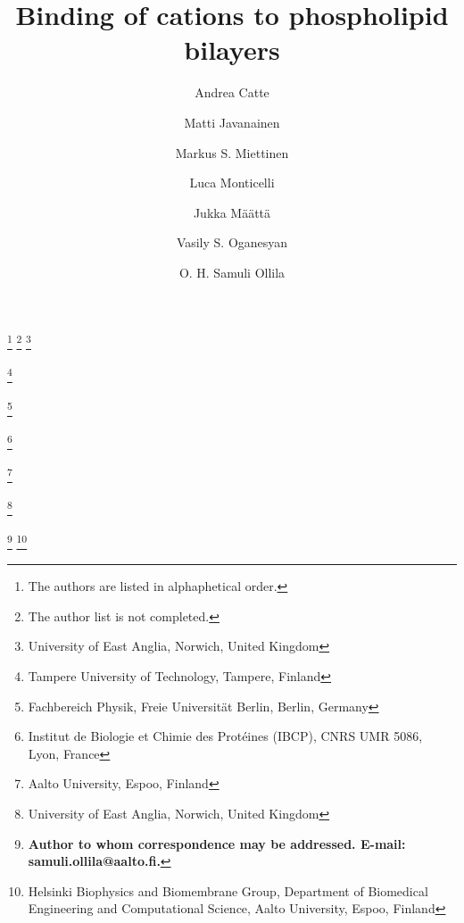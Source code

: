 \documentclass[pre,aps,floatfix,authordate1-4,twocolumn]{revtex4-1}
\begin{document}

\title{Binding of cations to phospholipid bilayers}

\author{Andrea Catte}
\thanks{The authors are listed in alphaphetical order.}
\thanks{The author list is not completed.}
\thanks{University of East Anglia, Norwich, United Kingdom}
\author{Matti Javanainen}
\thanks{Tampere University of Technology, Tampere, Finland}
\author{Markus S. Miettinen}
\thanks{Fachbereich Physik, Freie Universit\"at Berlin, Berlin, Germany}
\author{Luca Monticelli}
\thanks{Institut de Biologie et Chimie des Prot{\'e}ines (IBCP), CNRS UMR 5086, Lyon, France}
\author{Jukka M{\"a}{\"a}tt{\"a}}
\thanks{Aalto University, Espoo, Finland}
\author{Vasily S. Oganesyan}
\thanks{University of East Anglia, Norwich, United Kingdom}
\author{O. H. Samuli Ollila} 
\thanks{{\bf Author to whom correspondence may be addressed. E-mail: samuli.ollila@aalto.fi.}}
\thanks{Helsinki Biophysics and Biomembrane Group, Department of Biomedical Engineering and Computational Science, Aalto University, Espoo, Finland}
\end{document}
